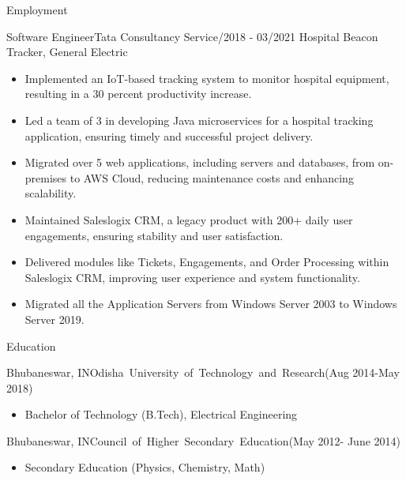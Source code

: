\documentclass[]{mcdowellcv}
\begin{document}
\begin{cvsection}{Employment}
        \begin{cvsubsection}{Software Engineer}{Tata Consultancy Service}{/2018 - 03/2021}
            Hospital Beacon Tracker, General Electric
            \begin{itemize}
                \item Implemented an IoT-based tracking system to monitor hospital equipment, resulting in a 30 percent productivity increase.
                \item Led a team of 3 in developing Java microservices for a hospital tracking application, ensuring timely and successful project delivery.
                \item Migrated over 5 web applications, including servers and databases, from on-premises to AWS Cloud, reducing maintenance costs and enhancing scalability.
                \item Maintained Saleslogix CRM, a legacy product with 200+ daily user engagements, ensuring stability and user satisfaction.
                \item Delivered modules like Tickets, Engagements, and Order Processing within Saleslogix CRM, improving user experience and system functionality.
                \item Migrated all the Application Servers from Windows Server 2003 to Windows Server 2019.
            \end{itemize}
        \end{cvsubsection}
    \end{cvsection}

    \begin{cvsection}{Education}
        \begin{cvsubsection}{Bhubaneswar, IN}{\mbox{Odisha University of Technology and Research}}{(Aug 2014-May 2018)}
            \begin{itemize}
                \item Bachelor of Technology (B.Tech), Electrical Engineering
            \end{itemize}
        \end{cvsubsection}
        \begin{cvsubsection}{Bhubaneswar, IN}{\mbox{Council of Higher Secondary Education}}{(May 2012- June 2014)}
            \begin{itemize}
                \item Secondary Education (Physics, Chemistry, Math)
            \end{itemize}
        \end{cvsubsection}
    \end{cvsection}
\end{document}
